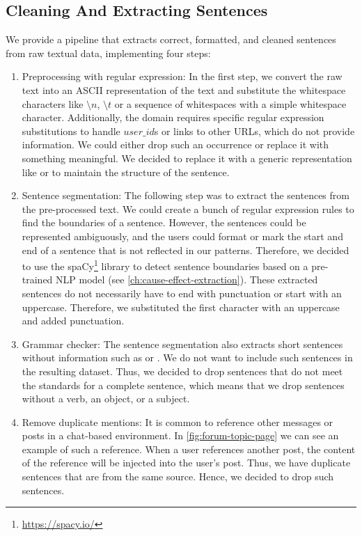 \subsection{Cleaning And Extracting Sentences}\label{subsec:cleaning-and-extracting-sentences}
We provide a pipeline that extracts correct, formatted, and cleaned sentences from raw textual data, implementing four steps:
\begin{enumerate}
    \item Preprocessing with regular expression: In the first step, we convert the raw text into an ASCII representation of the text and substitute the whitespace characters like $\setminus n$, $\setminus t$ or a sequence of whitespaces with a simple whitespace character.
    Additionally, the domain requires specific regular expression substitutions to handle $user\_id$s or links to other \ac{URL}s, which do not provide information.
    We could either drop such an occurrence or replace it with something meaningful.
    We decided to replace it with a generic representation like  or  to maintain the structure of the sentence.
    \item Sentence segmentation: The following step was to extract the sentences from the pre-processed text.
    We could create a bunch of regular expression rules to find the boundaries of a sentence.
    However, the sentences could be represented ambiguously, and the users could format or mark the start and end of a sentence that is not reflected in our patterns.
    Therefore, we decided to use the spaCy\footnote{\url{https://spacy.io/}} library to detect sentence boundaries based on a pre-trained \ac{NLP} model (see \autoref{ch:cause-effect-extraction}).
    These extracted sentences do not necessarily have to end with punctuation or start with an uppercase.
    Therefore, we substituted the first character with an uppercase and added punctuation.
    \item Grammar checker: The sentence segmentation also extracts short sentences without information such as  or .
    We do not want to include such sentences in the resulting dataset.
    Thus, we decided to drop sentences that do not meet the standards for a complete sentence, which means that we drop sentences without a verb, an object, or a subject.
    \item Remove duplicate mentions: It is common to reference other messages or posts in a chat-based environment.
    In \autoref{fig:forum-topic-page} we can see an example of such a reference.
    When a user references another post, the content of the reference will be injected into the user's post.
    Thus, we have duplicate sentences that are from the same source.
    Hence, we decided to drop such sentences.
\end{enumerate}

